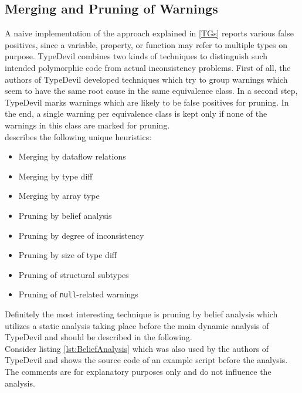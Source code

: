 \documentclass[runningheads,a4paper]{llncs}
\begin{document}
\newpage
\subsection{Merging and Pruning of Warnings}

A naive implementation of the approach explained in \ref{TGs} reports various false positives, since a variable, property, or function may refer to multiple types on purpose. 
TypeDevil combines two kinds of techniques to distinguish such intended polymorphic code from actual inconsistency problems. 
First of all, the authors of TypeDevil developed techniques which try to group warnings which seem to have the same root cause in the same equivalence class.
In a second step, TypeDevil marks warnings which are likely to be false positives for pruning.
In the end, a single warning per equivalence class is kept only if none of the warnings in this class are marked for pruning.\\
\cite{DBLP:conf/icse/PradelSS15} describes the following unique heuristics:
\begin{itemize}
    \item Merging by dataflow relations
    \item Merging by type diff
    \item Merging by array type
    \item Pruning by belief analysis
    \item Pruning by degree of inconsistency
    \item Pruning by size of type diff
    \item Pruning of structural subtypes
    \item Pruning of \lstinline[columns=fixed]{null}-related warnings
  \end{itemize}
Definitely the most interesting technique is pruning by belief analysis which utilizes a static analysis taking place before the main dynamic analysis of TypeDevil and should be described in the following.\\
Consider listing \ref{lst:BeliefAnalysis} which was also used by the authors of TypeDevil \cite{DBLP:conf/icse/PradelSS15} and shows the source code of an example script before the analysis. The comments are for explanatory purposes only and do not influence the analysis.
\end{document}

